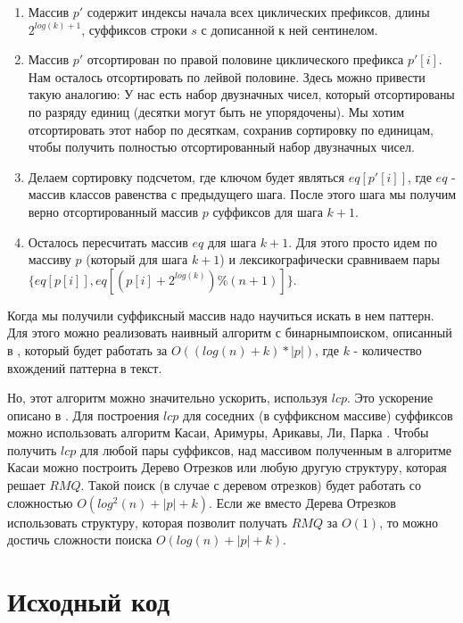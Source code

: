 \begin{enumerate}
\begin{enumerate}
\begin{enumerate}
            \item Массив $p'$ содержит индексы начала всех циклических префиксов, длины $2 ^ {log(k) + 1}$, суффиксов строки $s$ с дописанной к ней сентинелом.
            \item Массив $p'$ отсортирован по правой половине циклического префикса $p'[i]$. Нам осталось отсортировать по лейвой половине. Здесь можно привести такую аналогию: У нас есть набор двузначных чисел, который отсортированы по разряду единиц (десятки могут быть не упорядочены). Мы хотим отсортировать этот набор по десяткам, сохранив сортировку по единицам, чтобы получить полностью отсортированный набор двузначных чисел.
            \item Делаем сортировку подсчетом, где ключом будет являться $eq[p'[i]]$, где $eq$ - массив классов равенства с предыдущего шага. После этого шага мы получим верно отсортированный массив $p$ суффиксов для шага $k + 1$. 
            \item Осталось пересчитать массив $eq$ для шага $k + 1$. Для этого просто идем по массиву $p$ (который для шага $k + 1$) и лексикографически сравниваем пары $\{eq[p[i]], eq[(p[i] + 2^{log(k)}) \% (n + 1)]\}$.
        \end{enumerate}
    \end{enumerate}
\end{enumerate}

Когда мы получили суффиксный массив надо научиться искать в нем паттерн.
Для этого можно реализовать наивный алгоритм с $бинарным поиском$, описанный в \cite{search-in-suffix-tree-itmo}, который будет работать за $O((log(n) + k) * |p|)$, где $k$ - количество вхождений паттерна в текст.

Но, этот алгоритм можно значительно ускорить, используя $lcp$. Это ускорение описано в \cite{Gusfield}. Для построения $lcp$ для соседних (в суффиксном массиве) суффиксов можно использовать алгоритм Касаи, Аримуры, Арикавы, Ли, Парка \cite{kasai-algorithm-itmo}. Чтобы получить $lcp$ для любой пары суффиксов, над массивом полученным в алгоритме Касаи можно построить Дерево Отрезков или любую другую структуру, которая решает $RMQ$. Такой поиск (в случае с деревом отрезков) будет работать со сложностью $O(log^2(n) + |p| + k)$. Если же вместо Дерева Отрезков использовать структуру, которая позволит получать $RMQ$ за $O(1)$, то можно достичь сложности поиска $O(log(n) + |p| + k)$.

\pagebreak

\section{Исходный код}

